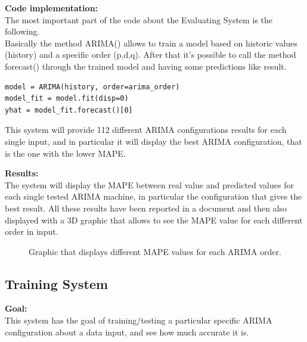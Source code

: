 \textbf{Code implementation:}\\
The most important part of the code about the Evaluating System is the following.\\
Basically the method ARIMA() allows to train a model based on historic values (history) and a specific order (p,d,q). After that it's possible to call the method forecast() through the trained model and having some predictions like result.
\begin{lstlisting}
model = ARIMA(history, order=arima_order)
model_fit = model.fit(disp=0)
yhat = model_fit.forecast()[0]
\end{lstlisting}

This system will provide 112 different ARIMA configurations results for each single input, and in particular it will display the best ARIMA configuration, that is the one with the lower MAPE.

\textbf{Results:}\\
The system will display the MAPE between real value and predicted values for each single tested ARIMA machine, in particular the configuration that gives the best result.
All these results have been reported in a document and then also displayed with a 3D graphic that allows to see the MAPE value for each different order in input.



\begin{figure}[H]
	\raggedleft
    \caption{Graphic that displays different MAPE values for each ARIMA order.}
\end{figure}

 
 
\newpage
\subsection{Training System}
\textbf{Goal:}\\ 
This system has the goal of training/testing a particular specific ARIMA configuration about a data input, and see how much accurate it is. \\


